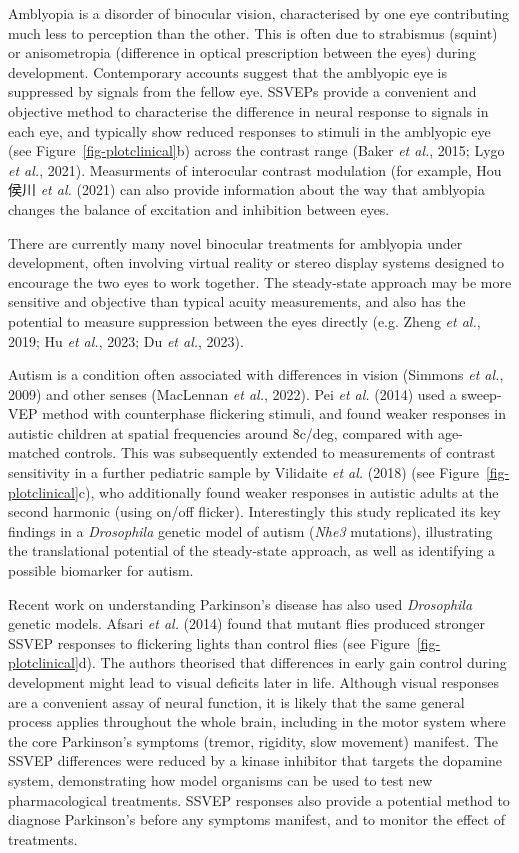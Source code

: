 \documentclass[
  letterpaper,
  DIV=11,
  numbers=noendperiod]{scrartcl}
\begin{document}
Amblyopia is a disorder of binocular vision, characterised by one eye
contributing much less to perception than the other. This is often due
to strabismus (squint) or anisometropia (difference in optical
prescription between the eyes) during development. Contemporary accounts
suggest that the amblyopic eye is suppressed by signals from the fellow
eye. SSVEPs provide a convenient and objective method to characterise
the difference in neural response to signals in each eye, and typically
show reduced responses to stimuli in the amblyopic eye (see
Figure~\ref{fig-plotclinical}b) across the contrast range (Baker
\emph{et al.}, 2015; Lygo \emph{et al.}, 2021). Measurments of
interocular contrast modulation (for example, Hou 侯川 \emph{et al.}
(2021) can also provide information about the way that amblyopia changes
the balance of excitation and inhibition between eyes.

There are currently many novel binocular treatments for amblyopia under
development, often involving virtual reality or stereo display systems
designed to encourage the two eyes to work together. The steady-state
approach may be more sensitive and objective than typical acuity
measurements, and also has the potential to measure suppression between
the eyes directly (e.g. Zheng \emph{et al.}, 2019; Hu \emph{et al.},
2023; Du \emph{et al.}, 2023).

Autism is a condition often associated with differences in vision
(Simmons \emph{et al.}, 2009) and other senses (MacLennan \emph{et al.},
2022). Pei \emph{et al.} (2014) used a sweep-VEP method with
counterphase flickering stimuli, and found weaker responses in autistic
children at spatial frequencies around 8c/deg, compared with age-matched
controls. This was subsequently extended to measurements of contrast
sensitivity in a further pediatric sample by Vilidaite \emph{et al.}
(2018) (see Figure~\ref{fig-plotclinical}c), who additionally found
weaker responses in autistic adults at the second harmonic (using on/off
flicker). Interestingly this study replicated its key findings in a
\emph{Drosophila} genetic model of autism (\emph{Nhe3} mutations),
illustrating the translational potential of the steady-state approach,
as well as identifying a possible biomarker for autism.

Recent work on understanding Parkinson's disease has also used
\emph{Drosophila} genetic models. Afsari \emph{et al.} (2014) found that
mutant flies produced stronger SSVEP responses to flickering lights than
control flies (see Figure~\ref{fig-plotclinical}d). The authors
theorised that differences in early gain control during development
might lead to visual deficits later in life. Although visual responses
are a convenient assay of neural function, it is likely that the same
general process applies throughout the whole brain, including in the
motor system where the core Parkinson's symptoms (tremor, rigidity, slow
movement) manifest. The SSVEP differences were reduced by a kinase
inhibitor that targets the dopamine system, demonstrating how model
organisms can be used to test new pharmacological treatments. SSVEP
responses also provide a potential method to diagnose Parkinson's before
any symptoms manifest, and to monitor the effect of treatments.
\end{document}
